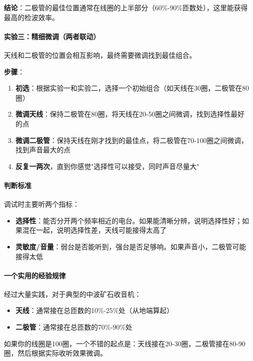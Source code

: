 \documentclass[12pt,UTF8]{ctexbook}
\begin{document}
\textbf{结论}：二极管的最佳位置通常在线圈的上半部分（60\%-90\%匝数处），这里能获得最高的检波效率。

\paragraph{实验三：精细微调（两者联动）}

天线和二极管的位置会相互影响，最终需要微调找到最佳组合。

\textbf{步骤}：
\begin{enumerate}[leftmargin=3.5em]
	\item \textbf{初选}：根据实验一和实验二，选择一个初始组合（如天线在30圈，二极管在80圈）
	\item \textbf{微调天线}：保持二极管在80圈，将天线在20-50圈之间微调，找到选择性最好的点
	\item \textbf{微调二极管}：保持天线在刚才找到的最佳点，将二极管在70-100圈之间微调，找到声音最大的点
	\item \textbf{反复一两次}，直到你感觉"选择性可以接受，同时声音尽量大"
\end{enumerate}

\paragraph{判断标准}

调试时主要听两个指标：
\begin{itemize}[leftmargin=3.5em]
	\item \textbf{选择性}：能否分开两个频率相近的电台。如果能清晰分辨，说明选择性好；如果混在一起，说明选择性差，天线可能接得太高了
	\item \textbf{灵敏度/音量}：弱台是否能听到，强台是否足够响。如果声音小，二极管可能接得太低
\end{itemize}

\paragraph{一个实用的经验规律}

经过大量实践，对于典型的中波矿石收音机：
\begin{itemize}[leftmargin=3.5em]
	\item \textbf{天线}：通常接在总匝数的10\%-25\%处（从地端算起）
	\item \textbf{二极管}：通常接在总匝数的70\%-90\%处
\end{itemize}

如果你的线圈是100圈，一个不错的起点是：天线接在20-30圈，二极管接在80-90圈，然后根据实际收听效果微调。
\end{document}
